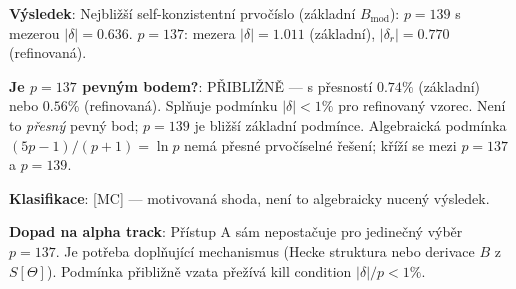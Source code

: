 \documentclass[12pt,a4paper]{article}
\theoremstyle{definition}
\theoremstyle{remark}
\begin{document}
\begin{statusbox}
\textbf{Výsledek}:
Nejbližší self-konzistentní prvočíslo (základní $B_{\mathrm{mod}}$):
$p = 139$ s mezerou $|\delta| = 0.636$.
$p = 137$: mezera $|\delta| = 1.011$ (základní), $|\delta_r| = 0.770$ (refinovaná).

\textbf{Je $p=137$ pevným bodem?}:
PŘIBLIŽNĚ — s přesností $0.74\%$ (základní) nebo $0.56\%$ (refinovaná).
Splňuje podmínku $|\delta| < 1\%$ pro refinovaný vzorec.
Není to \emph{přesný} pevný bod; $p=139$ je bližší základní podmínce.
Algebraická podmínka $(5p-1)/(p+1) = \ln p$ nemá přesné prvočíselné řešení;
kříží se mezi $p=137$ a $p=139$.

\textbf{Klasifikace}: [MC] — motivovaná shoda, není to algebraicky nucený výsledek.

\textbf{Dopad na alpha track}: Přístup A sám nepostačuje pro jedinečný výběr $p=137$.
Je potřeba doplňující mechanismus (Hecke struktura nebo derivace $B$ z $S[\Theta]$).
Podmínka přibližně vzata přežívá kill condition $|\delta|/p < 1\%$.
\end{statusbox}

\ifdefined\INCLUDEMODE
\else
  
\end{document}
